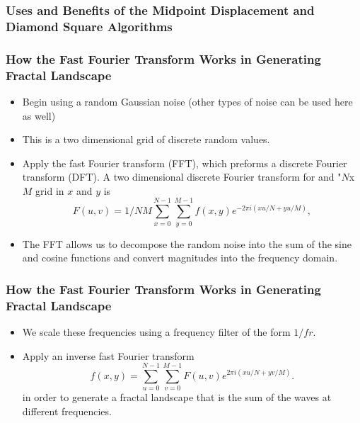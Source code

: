 \documentclass{beamer}
\begin{document}
\begin{frame}
\frametitle{Uses and Benefits of the Midpoint Displacement and Diamond Square Algorithms}
\end{frame}



\begin{frame}
 \frametitle{How the Fast Fourier Transform Works in Generating Fractal Landscape}
\begin{itemize}
\item Begin using a random Gaussian noise (other types of noise can be used here as well)
\item This is a two dimensional grid of discrete random values. 
\item Apply the fast Fourier transform (FFT), which preforms a discrete Fourier transform (DFT). A two dimensional discrete Fourier transform for and "$N$x$M$ grid in $x$ and $y$ is 
	$$F(u,v)=1/NM\displaystyle\sum\limits_{x=0}^{N-1} \displaystyle\sum\limits_{y=0}^{M-1} f(x,y)e^{-2\pi i(xu/N+yu/M)},$$
\item The FFT allows us to decompose the random noise into the sum of the sine and cosine functions and convert magnitudes into the frequency domain. 
\end{itemize}
\end{frame}

\begin{frame}
\frametitle{How the Fast Fourier Transform Works in Generating Fractal Landscape}
\begin{itemize}
\item We scale these frequencies using a frequency filter of the form $1/fr$.
\item Apply an inverse fast Fourier transform
$$f(x,y)=\displaystyle\sum\limits_{u=0}^{N-1} \displaystyle\sum\limits_{v=0}^{M-1} F(u,v)e^{2\pi i(xu/N+yv/M)}.$$ 
in order to generate a fractal landscape that is the sum of the waves at different frequencies. 
\end{itemize}
\end{frame}
\end{document}
